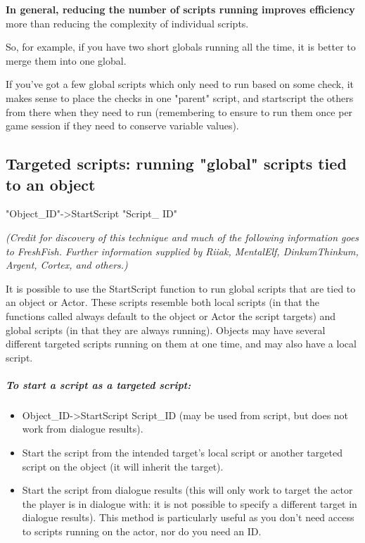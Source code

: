 \documentclass[
]{article}
\begin{document}
\textbf{In general, reducing the number of scripts running improves
efficiency} more than reducing the complexity of individual scripts.

So, for example, if you have two short globals running all the time, it
is better to merge them into one global.

If you've got a few global scripts which only need to run based on some
check, it makes sense to place the checks in one "parent" script, and
startscript the others from there when they need to run (remembering to
ensure to run them once per game session if they need to conserve
variable values).

\hypertarget{targeted-scripts-running-global-scripts-tied-to-an-object}{%
\subsection{\texorpdfstring{\hfill\break
Targeted scripts: running "global" scripts tied to an
object}{ Targeted scripts: running "global" scripts tied to an object}}\label{targeted-scripts-running-global-scripts-tied-to-an-object}}

"Object\_ID"-\textgreater StartScript "Script\_ ID"

\emph{(Credit for discovery of this technique and much of the following
information goes to FreshFish. Further information supplied by Riiak,
MentalElf, DinkumThinkum, Argent, Cortex, and others.)}

It is possible to use the StartScript function to run global scripts
that are tied to an object or Actor. These scripts resemble both local
scripts (in that the functions called always default to the object or
Actor the script targets) and global scripts (in that they are always
running). Objects may have several different targeted scripts running on
them at one time, and may also have a local script.

\hypertarget{to-start-a-script-as-a-targeted-script}{%
\subparagraph{To start a script as a targeted
script:}\label{to-start-a-script-as-a-targeted-script}}

\begin{itemize}
\item
  Object\_ID-\textgreater StartScript Script\_ID (may be used from
  script, but does not work from dialogue results).
\item
  Start the script from the intended target's local script or another
  targeted script on the object (it will inherit the target).
\item
  Start the script from dialogue results (this will only work to target
  the actor the player is in dialogue with: it is not possible to
  specify a different target in dialogue results). This method is
  particularly useful as you don't need access to scripts running on the
  actor, nor do you need an ID.
\end{itemize}
\end{document}
